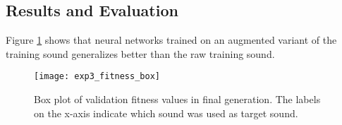 

\subsection{Results and Evaluation}
Figure \ref{fig:exp3_fitness_box} shows that neural networks trained on an augmented variant of the training sound generalizes better than the raw training sound.


\begin{figure}[H]
    \centering
    \texttt{[image: exp3\_fitness\_box]}
    \caption{Box plot of validation fitness values in final generation. The labels on the x-axis indicate which sound was used as target sound.}
    \label{fig:exp3_fitness_box}
\end{figure}
